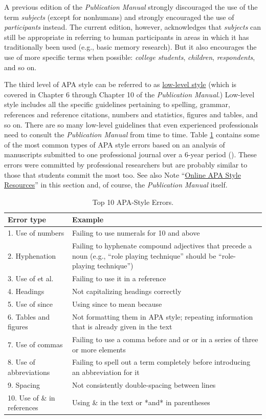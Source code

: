 \documentclass[
]{krantz}
\begin{document}
A previous edition of the \emph{Publication Manual} strongly discouraged the use of the term \emph{subjects} (except for nonhumans) and strongly encouraged the use of \emph{participants} instead. The current edition, however, acknowledges that \emph{subjects} can still be appropriate in referring to human participants in areas in which it has traditionally been used (e.g., basic memory research). But it also encourages the use of more specific terms when possible: \emph{college students}, \emph{children}, \emph{respondents}, and so on.

The third level of APA style can be referred to as \hyperref[low-level-style]{low-level style} (which is covered in Chapter 6 through Chapter 10 of the \emph{Publication Manual}.) Low-level style includes all the specific guidelines pertaining to spelling, grammar, references and reference citations, numbers and statistics, figures and tables, and so on. There are so many low-level guidelines that even experienced professionals need to consult the \emph{Publication Manual} from time to time. Table \ref{tab:errors} contains some of the most common types of APA style errors based on an analysis of manuscripts submitted to one professional journal over a 6-year period (). These errors were committed by professional researchers but are probably similar to those that students commit the most too. See also Note ``\hyperref[online-apa-style-resources]{Online APA Style Resources}'' in this section and, of course, the \emph{Publication Manual} itself.

\begin{table}

\caption{\label{tab:errors}Top 10 APA-Style Errors.}
\centering
\begin{tabular}[t]{l|l}
\hline
Error type & Example\\
\hline
1. Use of numbers & Failing to use numerals for 10 and above\\
\hline
2. Hyphenation & Failing to hyphenate compound adjectives that precede a noun (e.g., “role playing technique” should be “role-playing technique”)\\
\hline
3. Use of et al. & Failing to use it in a reference\\
\hline
4. Headings & Not capitalizing headings correctly\\
\hline
5. Use of since & Using since to mean because\\
\hline
6. Tables and figures & Not formatting them in APA style; repeating information that is already given in the text\\
\hline
7. Use of commas & Failing to use a comma before and or or in a series of three or more elements\\
\hline
8. Use of abbreviations & Failing to spell out a term completely before introducing an abbreviation for it\\
\hline
9. Spacing & Not consistently double-spacing between lines\\
\hline
10. Use of \& in references & Using \& in the text or *and* in parentheses\\
\hline
\end{tabular}
\end{table}
\end{document}
